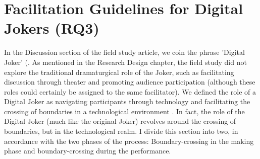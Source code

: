\documentclass[dissertation,math,vertlayout,pdfa,colorlinks]{aaltoseries}
\begin{document}
\section{Facilitation Guidelines for Digital Jokers (RQ3)}
In the Discussion section of the field study article, we coin the phrase 'Digital Joker' (\cite[p. 19]{peledTeleroboticTheaterOppressed2025}. As mentioned in the Research Design chapter, the field study did not explore the traditional dramaturgical role of the Joker, such as facilitating discussion through theater and promoting audience participation (although these roles could certainly be assigned to the same facilitator). We defined the role of a Digital Joker as navigating participants through technology and facilitating the crossing of boundaries in a technological environment \cite[p. 19]{peledTeleroboticTheaterOppressed2025}. In fact, the role of the Digital Joker (much like the original Joker) revolves around the crossing of boundaries, but in the technological realm. I divide this section into two, in accordance with the two phases of the process: Boundary-crossing in the making phase and boundary-crossing during the performance.
\end{document}
